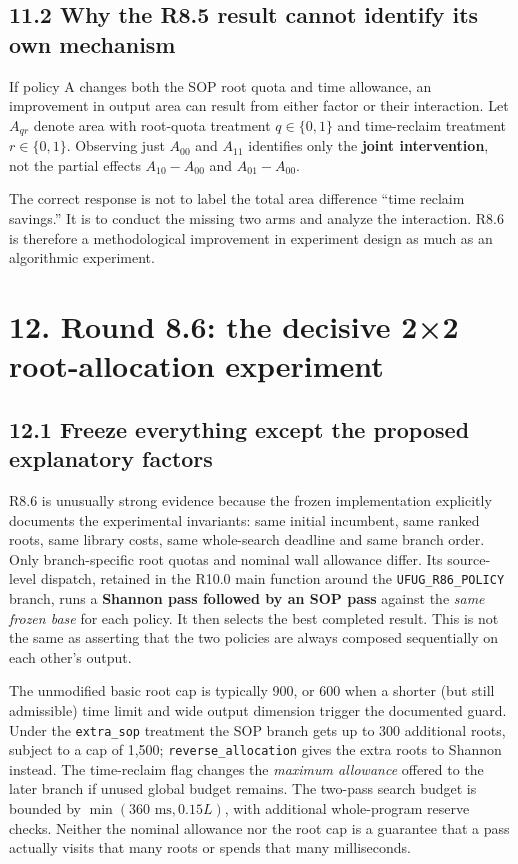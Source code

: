 \documentclass[a4paper,10pt]{article}
\theoremstyle{definition}
\theoremstyle{remark}
\begin{document}
\subsection{11.2 Why the R8.5 result cannot identify its own mechanism}\label{why-the-r8.5-result-cannot-identify-its-own-mechanism}

If policy A changes both the SOP root quota and time allowance, an improvement in output area can result from either factor or their interaction. Let \(A_{qr}\) denote area with root-quota treatment \(q\in\{0,1\}\) and time-reclaim treatment \(r\in\{0,1\}\). Observing just \(A_{00}\) and \(A_{11}\) identifies only the \textbf{joint intervention}, not the partial effects \(A_{10}-A_{00}\) and \(A_{01}-A_{00}\).

The correct response is not to label the total area difference ``time reclaim savings.'' It is to conduct the missing two arms and analyze the interaction. R8.6 is therefore a methodological improvement in experiment design as much as an algorithmic experiment.

\section{12. Round 8.6: the decisive 2×2 root-allocation experiment}\label{round-8.6-the-decisive-22-root-allocation-experiment}

\subsection{12.1 Freeze everything except the proposed explanatory factors}\label{freeze-everything-except-the-proposed-explanatory-factors}

R8.6 is unusually strong evidence because the frozen implementation explicitly documents the experimental invariants: same initial incumbent, same ranked roots, same library costs, same whole-search deadline and same branch order. Only branch-specific root quotas and nominal wall allowance differ. Its source-level dispatch, retained in the R10.0 main function around the \texttt{UFUG\_R86\_POLICY} branch, runs a \textbf{Shannon pass followed by an SOP pass} against the \emph{same frozen base} for each policy. It then selects the best completed result. This is not the same as asserting that the two policies are always composed sequentially on each other's output.

The unmodified basic root cap is typically 900, or 600 when a shorter (but still admissible) time limit and wide output dimension trigger the documented guard. Under the \texttt{extra\_sop} treatment the SOP branch gets up to 300 additional roots, subject to a cap of 1,500; \texttt{reverse\_allocation} gives the extra roots to Shannon instead. The time-reclaim flag changes the \emph{maximum allowance} offered to the later branch if unused global budget remains. The two-pass search budget is bounded by \(\min(360\text{ ms},0.15L)\), with additional whole-program reserve checks. Neither the nominal allowance nor the root cap is a guarantee that a pass actually visits that many roots or spends that many milliseconds.
\end{document}
